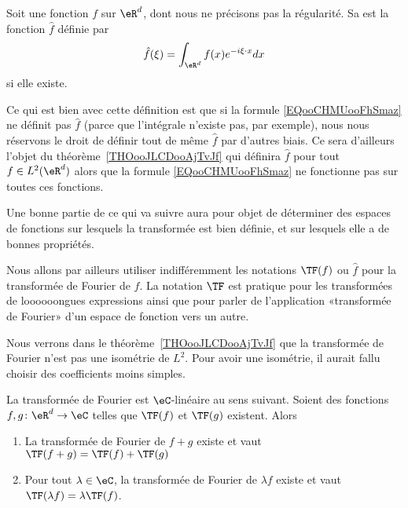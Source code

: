 

\begin{definition}      \label{DEFooRIXGooECoIbx}
    Soit une fonction \( f\) sur \( \eR^d\), dont nous ne précisons pas la régularité. Sa  est la fonction \( \hat f\) définie par
    \begin{equation}        \label{EQooCHMUooFhSmaz}
            \hat f(\xi)=\int_{\eR^d} f(x) e^{-i\xi\cdot x}dx
    \end{equation}
    si elle existe.
\end{definition}

\begin{normaltext}
    Ce qui est bien avec cette définition est que si la formule \eqref{EQooCHMUooFhSmaz} ne définit pas \( \hat f\) (parce que l'intégrale n'existe pas, par exemple), nous nous réservons le droit de définir tout de même \( \hat f\) par d'autres biais. Ce sera d'ailleurs l'objet du théorème~\ref{THOooJLCDooAjTvJf} qui définira \( \hat f\) pour tout \( f\in L^2(\eR^d)\) alors que la formule \eqref{EQooCHMUooFhSmaz} ne fonctionne pas sur toutes ces fonctions.

    Une bonne partie de ce qui va suivre aura pour objet de déterminer des espaces de fonctions sur lesquels la transformée est bien définie, et sur lesquels elle a de bonnes propriétés.

    Nous allons par ailleurs utiliser indifféremment les notations \( \TF(f)\) ou \( \hat f\) pour la transformée de Fourier de \( f\). La notation \( \TF\) est pratique pour les transformées de loooooongues expressions ainsi que pour parler de l'application «transformée de Fourier» d'un espace de fonction vers un autre.
\end{normaltext}

\begin{normaltext}
    Nous verrons dans le théorème~\ref{THOooJLCDooAjTvJf} que la transformée de Fourier n'est pas une isométrie de \( L^2\). Pour avoir une isométrie, il aurait fallu choisir des coefficients moins simples.
\end{normaltext}

\begin{proposition}
    La transformée de Fourier est \( \eC\)-linéaire au sens suivant. Soient des fonctions \( f,g\colon \eR^d\to \eC\) telles que \( \TF(f)\) et \( \TF(g)\) existent. Alors
    \begin{enumerate}
        \item
            La transformée de Fourier de \( f+g\) existe et vaut \( \TF(f+g)=\TF(f)+\TF(g)\)
        \item
            Pour tout \( \lambda\in \eC\), la transformée de Fourier de \( \lambda f\) existe et vaut \( \TF(\lambda f)=\lambda\TF(f)\).
    \end{enumerate}
\end{proposition}


